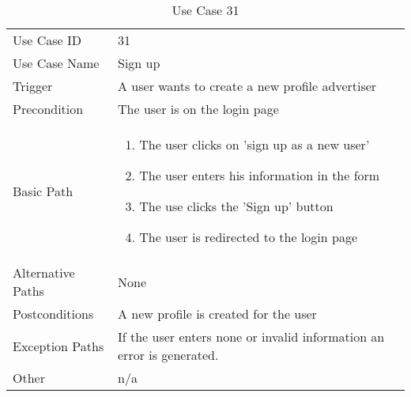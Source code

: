 \begin{table}[H]
\centering
\label{table-use-case-31}
\begin{tabular}{|p{3cm}|p{10cm}}
Use Case ID       & 31                                                           
\\
Use Case Name     & Sign up                                                         
\\
Trigger           & A user wants to create a new profile
advertiser
\\
Precondition      & The user is on the login page                                                
\\
Basic Path        & \begin{enumerate}
\item The user clicks on 'sign up as a new user'
\item The user enters his information in the form
\item The use clicks the 'Sign up' button
\item The user is redirected to the login page
\end{enumerate} 
     \\
Alternative Paths & None                     
\\
Postconditions    & A new profile is created for the user
\\
Exception Paths   & If the user enters none or invalid information an error is
generated. 
\\
Other             & n/a                                                                                                                                                                                                        
\end{tabular}
\caption{Use Case 31}
\end{table}

